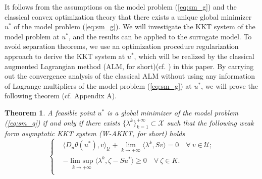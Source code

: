 \documentclass[leqno]{amsart}
\DeclareMathOperator*\uplim{lim\ sup}
\newtheorem{theorem}{Theorem}[section]
\theoremstyle{definition}
\begin{document}
It follows from the assumptions on the model problem (\ref{eq:sm_g}) and the classical convex optimization theory that there exists a unique global minimizer $u^*$ of the model problem (\ref{eq:sm_g}). We will investigate the KKT system of the model problem at $u^*$, and the results can be applied to the surrogate model. To avoid separation theorems, we use an optimization procedure regularization approach to derive the KKT system at $u^*$, which will be realized by the classical augmented Lagrangian method (ALM, for short)(cf. \cite{hestenes1969multiplier, powell1969method}) in this paper. By carrying out the convergence analysis of the classical ALM without using any information of Lagrange multipliers of the model problem (\ref{eq:sm_g}) at $u^*$, we will prove the following theorem (cf. Appendix A). 
\begin{theorem}\label{thm:w-akkt}
A feasible point $u^*$ is a global minimizer of the model problem (\ref{eq:sm_g}) if and only if there exists $\{\lambda^k\}_{k=1}^{+\infty}\subset \mathcal{X}$ such that the following weak form asymptotic KKT system (W-AKKT, for short) holds
\begin{equation}\label{eq:w-akkt}
\left\{
\begin{aligned}
& \langle D_u\theta(u^*), v\rangle_\mathcal{U}  + \lim\limits_{k\rightarrow +\infty}\langle \lambda^{k}, Sv\rangle = 0\quad \forall\ v\in \mathcal{U};\\
& - \uplim\limits_{k\rightarrow+\infty}\langle\lambda^{k} ,\zeta - Su^*\rangle\geq 0\quad \forall\ \zeta\in K.\\
\end{aligned}
\right.
\end{equation}
\end{theorem}
\end{document}
